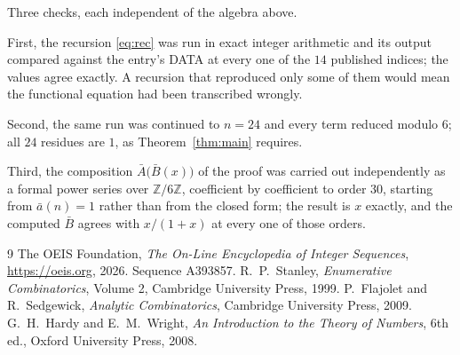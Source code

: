 \documentclass[11pt,a4paper]{article}
\theoremstyle{plain}
\theoremstyle{definition}
\begin{document}
Three checks, each independent of the algebra above.

First, the recursion \eqref{eq:rec} was run in exact integer arithmetic and its output
compared against the entry's DATA at every one of the $14$ published indices; the
values agree exactly. A recursion that reproduced only some of them would mean the
functional equation had been transcribed wrongly.

Second, the same run was continued to $n=24$ and every term reduced modulo $6$; all
$24$ residues are $1$, as Theorem~\ref{thm:main} requires.

Third, the composition $\bar A\bigl(\bar B(x)\bigr)$ of the proof was carried out
independently as a formal power series over $\mathbb{Z}/6\mathbb{Z}$, coefficient by
coefficient to order $30$, starting from $\bar a(n)=1$ rather than from the closed form;
the result is $x$ exactly, and the computed $\bar B$ agrees with $x/(1+x)$ at every one of
those orders.

\begin{thebibliography}{9}
 The OEIS Foundation, \emph{The On-Line Encyclopedia of Integer
Sequences}, \url{https://oeis.org}, 2026. Sequence A393857.
 R.~P.~Stanley, \emph{Enumerative Combinatorics}, Volume 2, Cambridge
University Press, 1999.
 P.~Flajolet and R.~Sedgewick, \emph{Analytic Combinatorics}, Cambridge
University Press, 2009.
 G.~H.~Hardy and E.~M.~Wright, \emph{An Introduction to the Theory of
Numbers}, 6th ed., Oxford University Press, 2008.
\end{thebibliography}
\end{document}
